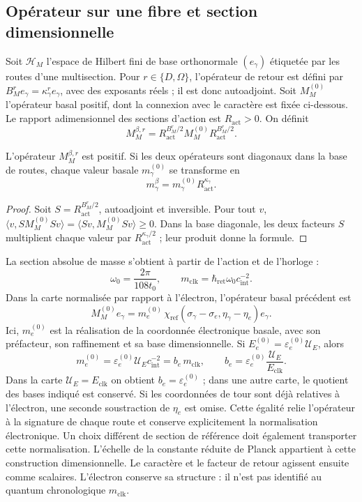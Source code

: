 \subsection{Opérateur sur une fibre et section dimensionnelle}

Soit \(\mathscr H_M\) l’espace de Hilbert fini de base orthonormale
\((e_\gamma)\) étiquetée par les routes d’une multisection. Pour
\(r\in\{D,\Omega\}\), l’opérateur de retour est défini par
\(B_M^re_\gamma=\kappa_\gamma^re_\gamma\), avec des exposants réels ;
il est donc autoadjoint. Soit \(M_M^{(0)}\) l’opérateur basal positif,
dont la connexion avec le caractère est fixée ci-dessous.
Le rapport adimensionnel des
sections d’action est \(R_{\mathrm{act}}>0\). On définit
\[
 M_M^{\beta,r}=R_{\mathrm{act}}^{B_M^r/2}
 M_M^{(0)}R_{\mathrm{act}}^{B_M^r/2}.
\]

\begin{proposition}
L’opérateur \(M_M^{\beta,r}\) est positif. Si les deux opérateurs sont
diagonaux dans la base de routes, chaque valeur basale \(m_\gamma^{(0)}\)
se transforme en
\[
 m_\gamma^\beta=m_\gamma^{(0)}R_{\mathrm{act}}^{\kappa_\gamma}.
\]
\end{proposition}
\begin{proof}
Soit \(S=R_{\mathrm{act}}^{B_M^r/2}\), autoadjoint et inversible.
Pour tout \(v\),
\(\langle v,SM_M^{(0)}Sv\rangle=\langle Sv,M_M^{(0)}Sv\rangle\ge0\).
Dans la base diagonale, les deux facteurs \(S\) multiplient chaque valeur
par \(R_{\mathrm{act}}^{\kappa_\gamma/2}\) ; leur produit donne la formule.
\end{proof}

La section absolue de masse s’obtient à partir de l’action et de l’horloge :
\[
 \omega_0=\frac{2\pi}{108t_0},\qquad
m_{\mathrm{clk}}=\hbar_{\mathrm{ret}}\omega_0c_{\mathrm{int}}^{-2}.
\]
Dans la carte normalisée par rapport à l'électron, l'opérateur basal précédent est
\[
 M_M^{(0)}e_\gamma
 =m_e^{(0)}\,
   \chi_{\mathrm{ref}}(\sigma_\gamma-\sigma_e,
                       \eta_\gamma-\eta_e)e_\gamma.
\]
Ici, \(m_e^{(0)}\) est la réalisation de la coordonnée électronique
basale, avec son préfacteur, son raffinement et sa base dimensionnelle.
Si \(E_e^{(0)}=\varepsilon_e^{(0)}\mathcal U_E\), alors
\[
 m_e^{(0)}=\varepsilon_e^{(0)}\mathcal U_Ec_{\mathrm{int}}^{-2}
 =b_e\,m_{\mathrm{clk}},\qquad
 b_e=\varepsilon_e^{(0)}\frac{\mathcal U_E}{E_{\mathrm{clk}}}.
\]
Dans la carte \(\mathcal U_E=E_{\mathrm{clk}}\) on obtient
\(b_e=\varepsilon_e^{(0)}\) ; dans une autre carte, le quotient
des bases indiqué est conservé. Si les coordonnées de tour sont déjà
relatives à l'électron, une seconde soustraction de \(\eta_e\) est omise.
Cette égalité relie l'opérateur à la signature de chaque route et conserve
explicitement la normalisation électronique. Un choix différent de
section de référence doit également transporter cette normalisation.
L'échelle de la constante réduite de Planck appartient à cette construction
dimensionnelle. Le caractère et le facteur de retour agissent ensuite comme
scalaires. L'électron conserve sa structure : il n'est pas identifié au
quantum chronologique \(m_{\mathrm{clk}}\).


